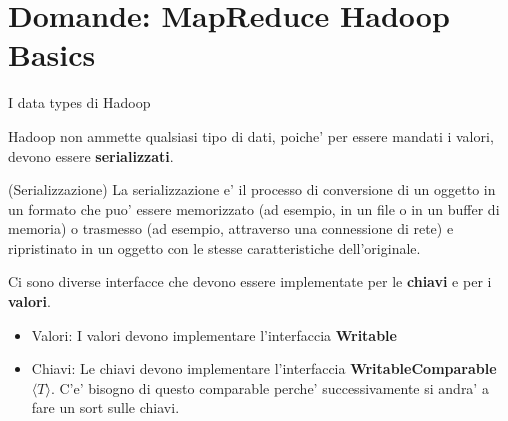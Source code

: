\section{Domande: MapReduce Hadoop Basics}

\begin{domanda}
    I data types di Hadoop
\end{domanda}

Hadoop non ammette qualsiasi tipo di dati, poiche' per essere mandati i valori,
devono essere \textbf{serializzati}.

\begin{definition}(Serializzazione)
    La serializzazione e' il processo di conversione di un oggetto
    in un formato che puo' essere memorizzato (ad esempio, in un file
    o in un buffer di memoria) o trasmesso (ad esempio, attraverso
    una connessione di rete) e ripristinato in un oggetto con le
    stesse caratteristiche dell'originale.
\end{definition}

Ci sono diverse interfacce che devono essere implementate per le
\textbf{chiavi} e per i \textbf{valori}.

\begin{itemize}
    \item Valori: I valori devono implementare l'interfaccia \textbf{Writable}
    \item Chiavi: Le chiavi devono implementare l'interfaccia
          \textbf{WritableComparable$\langle T \rangle$}. C'e' bisogno di questo
          comparable perche' successivamente si andra' a fare un sort sulle chiavi.
\end{itemize}

